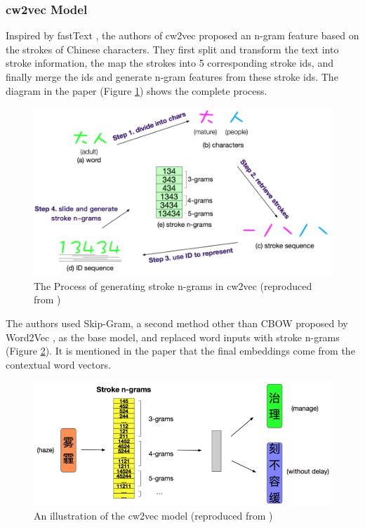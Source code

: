 \subsubsection{cw2vec Model}

Inspired by fastText \cite{bojanowski2017enriching}, the authors of cw2vec \cite{cao2018cw2vec} proposed an n-gram feature based on the strokes of Chinese characters. They first split and transform the text into stroke information, the map the strokes into 5 corresponding stroke ids, and finally merge the ids and generate n-gram features from these stroke ids. The diagram in the paper (Figure \ref{fig:cw2vec1}) shows the complete process.

\begin{figure}[h]
	\centering
	\includegraphics[scale=0.6]{../images/cw2vec_illustration1.png}
	\caption{The Process of generating stroke n-grams in cw2vec (reproduced from \cite{cao2018cw2vec})}
	\label{fig:cw2vec1}
\end{figure}

The authors used Skip-Gram, a second method other than CBOW proposed by Word2Vec \cite{mikolov2013efficient}, as the base model, and replaced word inputs with stroke n-grams (Figure \ref{fig:cw2vec2}). It is mentioned in the paper that the final embeddings come from the contextual word vectors.

\begin{figure}[h]
	\centering
	\includegraphics[scale=0.6]{../images/cw2vec_illustration2.png}
	\caption{An illustration of the cw2vec model (reproduced from \cite{cao2018cw2vec})}
	\label{fig:cw2vec2}
\end{figure}

